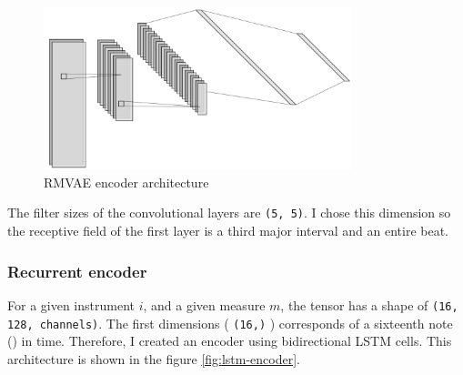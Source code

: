 \documentclass[12pt]{report}
\begin{document}
\begin{figure}[htbp]
    \centering
    \includegraphics[width=0.8\textwidth]{images/nn/architectures/rmvae/encoder.jpg}
    \caption{RMVAE encoder architecture}
    \label{fig:rmvae_encoder}
\end{figure}

The filter sizes of the convolutional layers are \texttt{(5, 5)}.
I chose this dimension so the receptive field of the first layer is a third major interval and an entire beat.

\subsubsection{Recurrent encoder}
\label{sec:encoder:rnn}

For a given instrument $i$, and a given measure $m$, the tensor has a shape of \texttt{(16, 128, channels)}.
The first dimensions ( \texttt{(16,)} ) corresponds of a sixteenth note (\musSixteenth) in time.
Therefore, I created an encoder using bidirectional LSTM cells.
This architecture is shown in the figure \ref{fig:lstm-encoder}.
\end{document}
